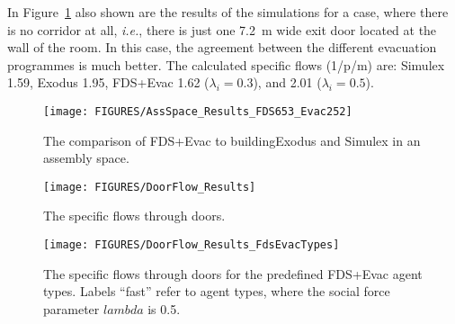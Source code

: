 \documentclass[12pt,a4paper,final,twoside]{stylevk}
\begin{document}
\begin{enumerate}
  In Figure~\ref{Fig_AssemblyResults} also shown are the results of
  the simulations for a case, where there is no corridor at all,
  \emph{i.e.}, there is just one 7.2~m wide exit door located at the
  wall of the room.  In this case, the agreement between the different
  evacuation programmes is much better.  The calculated specific flows
  (1/p/m) are: Simulex 1.59, Exodus 1.95, FDS+Evac 1.62
  ($\lambda_i=0.3$), and 2.01 ($\lambda_i=0.5$).

%
\begin{figure}[!tb]
  \centerline{\texttt{[image: FIGURES/AssSpace\_Results\_FDS653\_Evac252]}} 
  \caption{The comparison of FDS+Evac to buildingExodus
    and Simulex in an assembly space.}\label{Fig_AssemblyResults}
\end{figure}
%
%
%
\begin{figure}[!b]
  \centerline{\texttt{[image: FIGURES/DoorFlow\_Results]}} 
  \caption{The specific flows through doors.}\label{Fig_DoorResults}  
\end{figure}
%
%
\begin{figure}[!b]
  \centerline{\texttt{[image: FIGURES/DoorFlow\_Results\_FdsEvacTypes]}} 
  \caption{The specific flows through doors for the predefined
    FDS+Evac agent types. Labels ``fast'' refer to agent types, where
    the social force parameter $lambda$ is 0.5.}\label{Fig_DoorResultsHumanTypes}  
\end{figure}
%


\end{enumerate}
\end{document}
